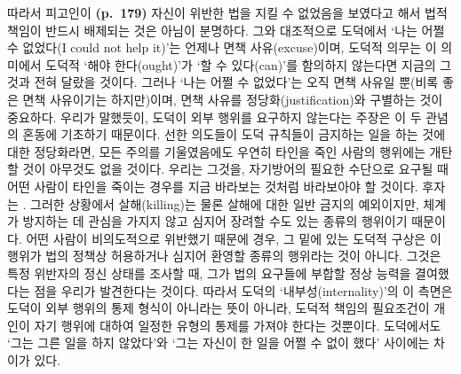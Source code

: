 따라서 피고인이 \textbf{(p.~179)} 자신이 위반한 법을 지킬 수 없었음을
보였다고 해서 법적 책임이 반드시 배제되는 것은 아님이 분명하다. 그와
대조적으로 도덕에서 ‘나는 어쩔 수 없었다(I could not help it)’는 언제나
면책 사유(excuse)이며, 도덕적 의무는 이 의미에서 도덕적 ‘해야
한다(ought)’가 ‘할 수 있다(can)’를 함의하지 않는다면 지금의 그것과 전혀
달랐을 것이다. 그러나 ‘나는 어쩔 수 없었다’는 오직 면책 사유일 뿐(비록
좋은 면책 사유이기는 하지만)이며, 면책 사유를 정당화(justification)와
구별하는 것이 중요하다. 우리가 말했듯이, 도덕이 외부 행위를 요구하지
않는다는 주장은 이 두 관념의 혼동에 기초하기 때문이다. 선한 의도들이
도덕 규칙들이 금지하는 일을 하는 것에 대한 정당화라면, 모든 주의를
기울였음에도 우연히 타인을 죽인 사람의 행위에는 개탄할 것이 아무것도
없을 것이다. 우리는 그것을, 자기방어의 필요한 수단으로 요구될 때 어떤
사람이 타인을 죽이는 경우를 지금 바라보는 것처럼 바라보아야 할 것이다.
후자는 . 그러한 상황에서 살해(killing)는
물론 살해에 대한 일반 금지의 예외이지만, 체계가 방지하는 데 관심을
가지지 않고 심지어 장려할 수도 있는 종류의 행위이기 때문이다. 어떤
사람이 비의도적으로 위반했기 때문에  경우, 그
밑에 있는 도덕적 구상은 이 행위가 법의 정책상 허용하거나 심지어 환영할
종류의 행위라는 것이 아니다. 그것은 특정 위반자의 정신 상태를 조사할 때,
그가 법의 요구들에 부합할 정상 능력을 결여했다는 점을 우리가 발견한다는
것이다. 따라서 도덕의 ‘내부성(internality)’의 이 측면은 도덕이 외부
행위의 통제 형식이 아니라는 뜻이 아니라, 도덕적 책임의 필요조건이 개인이
자기 행위에 대하여 일정한 유형의 통제를 가져야 한다는 것뿐이다.
도덕에서도 ‘그는 그른 일을 하지 않았다’와 ‘그는 자신이 한 일을 어쩔 수
없이 했다’ 사이에는 차이가 있다.

